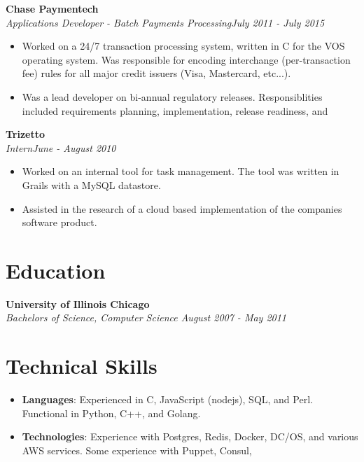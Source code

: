 \documentclass[10pt]{res}
\begin{document}
\begin{resume}
\textbf{Chase Paymentech} \\
{\sl \small{Applications Developer - Batch Payments Processing\hfill    July 2011 - July 2015 } }
\vspace{8pt} 
  \begin{itemize} \itemsep -2pt
    \item Worked on a 24/7 transaction processing system, written in C for the VOS operating system. Was responsible for encoding interchange (per-transaction fee) rules for all major credit issuers (Visa, Mastercard, etc...).
    \item Was a lead developer on bi-annual regulatory releases. Responsiblities included requirements planning, implementation, release readiness, and 
  \end{itemize} \vspace{-6pt}
 
\textbf{Trizetto} \\
{\sl \small{Intern\hfill June - August 2010 }}
\vspace{8pt} 
  \begin{itemize} \itemsep -2pt %
    \item Worked on an internal tool for task management. The tool was written in Grails with a MySQL datastore.
    \item Assisted in the research of a cloud based implementation of the companies software product.
  \end{itemize}

\section{\large{Education}}
\vspace{8pt} 
\textbf{University of Illinois Chicago} \\
{\sl Bachelors of Science, Computer Science \hfill August 2007 - May 2011 }
  
\section{\large{Technical Skills}}
\vspace{16pt}
\begin{itemize} \itemsep -2pt %
  \item \textbf{Languages}: Experienced in C, JavaScript (nodejs), SQL, and Perl. Functional in Python, C++, and Golang.
  \item \textbf{Technologies}: Experience with Postgres, Redis, Docker, DC/OS, and various AWS services. Some experience with Puppet, Consul, 
\end{itemize}


\end{resume} 
\end{document}
